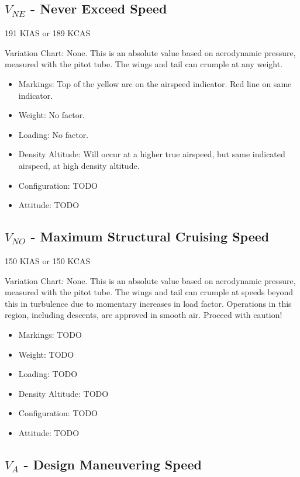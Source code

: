 \subsection{$V_{NE}$ - Never Exceed Speed}

191 KIAS or 189 KCAS

Variation Chart: None. This is an absolute value based on aerodynamic pressure, measured with the pitot tube. The wings and tail can crumple at any weight.

\begin{itemize}
\item Markings: Top of the yellow arc on the airspeed indicator. Red line on same indicator.
\item Weight: No factor.
\item Loading: No factor.
\item Density Altitude: Will occur at a higher true airspeed, but same indicated airspeed, at high density altitude.
\item Configuration: TODO
\item Attitude: TODO
\end{itemize}

\subsection{$V_{NO}$ - Maximum Structural Cruising Speed}

150 KIAS or 150 KCAS

Variation Chart: None. This is an absolute value based on aerodynamic pressure, measured with the pitot tube. The wings and tail can crumple at speeds beyond this in turbulence due to momentary increases in load factor. Operations in this region, including descents, are approved in smooth air. Proceed with caution!

\begin{itemize}
\item Markings: TODO
\item Weight: TODO
\item Loading: TODO
\item Density Altitude: TODO
\item Configuration: TODO
\item Attitude: TODO
\end{itemize}

\subsection{$V_A$ - Design Maneuvering Speed}

